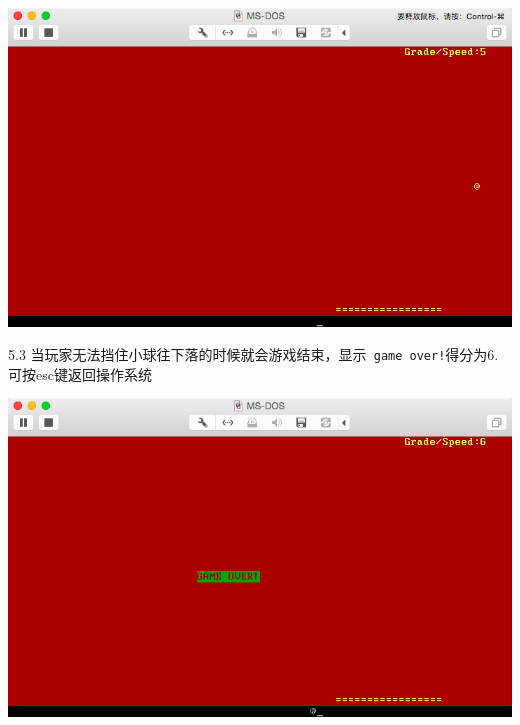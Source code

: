 \documentclass[a4paper]{article}
\begin{document}
{  \begin{center} \includegraphics[scale=0.5]{Illustrations/gaming.png} \end{center}
5.3 当玩家无法挡住小球往下落的时候就会游戏结束，显示\verb| game over!|得分为6.可按esc键返回操作系统\\
  \begin{center} \includegraphics[scale=0.5]{Illustrations/over.png} \end{center}


}
\end{document}
